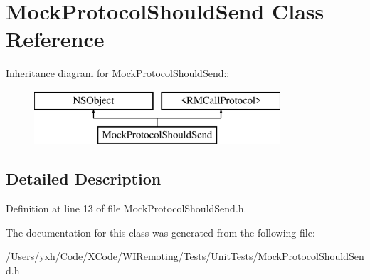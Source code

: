 \hypertarget{interface_mock_protocol_should_send}{
\section{MockProtocolShouldSend Class Reference}
\label{interface_mock_protocol_should_send}
}
Inheritance diagram for MockProtocolShouldSend::\begin{figure}[H]
\begin{center}
\leavevmode
\includegraphics[height=2cm]{interface_mock_protocol_should_send}
\end{center}
\end{figure}


\subsection{Detailed Description}


Definition at line 13 of file MockProtocolShouldSend.h.

The documentation for this class was generated from the following file:\begin{DoxyCompactItemize}
\item 
/Users/yxh/Code/XCode/WIRemoting/Tests/UnitTests/MockProtocolShouldSend.h\end{DoxyCompactItemize}
